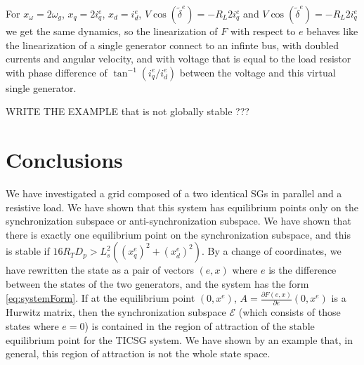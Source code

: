 \documentclass[letterpaper, 10 pt, conference]{ieeeconf}
\renewcommand{\o}    {{\omega}}
\begin{document}
For $x_\o=2\o_g$, $x_q=2 i_q^e$, $x_d=i_d^e$, $V\cos(\tilde{\delta}^e)
= -R_L 2 i_q^e$ and $V \cos(\tilde{\delta}^e) = -R_L 2 i_q^e$ we get
the same dynamics, so the linearization of $F$ with respect to $e$
behaves like the linearization of a single generator connect to an
infinte bus, with doubled currents and angular velocity, and with
voltage that is equal to the load resistor with phase difference of
$\tan^{-1}\left(i_q^e / i_d^e\right)$ between the voltage and this
virtual single generator.

WRITE THE EXAMPLE that is not globally stable ???

\section{Conclusions}

We have investigated a grid composed of a two identical SGs in
parallel and a resistive load. We have shown that this system has
equilibrium points only on the synchronization subspace or
anti-synchronization subspace. We have shown that there is exactly one
equilibrium point on the synchronization subspace, and this is stable
if $16 R_T D_p>L_s^2\left(\left(x_q^e\right)^2+\left(x_d^e\right)^2
\right)$. By a change of coordinates, we have rewritten the state as a
pair of vectors $(e,x)$ where $e$ is the difference between the states
of the two generators, and the system has the form 
\eqref{eq:systemForm}. If at the equilibrium point $(0,x^e)$,
$A=\frac{\partial F(e,x)}{\partial e}\left(0,x^e\right)$ is a Hurwitz
matrix, then the synchronization subspace $\mathscr{E}$ (which
consists of those states where $e=0$) is contained in the region of
attraction of the stable equilibrium point for the TICSG system. We
have shown by an example that, in general, this region of attraction
is not the whole state space.
\end{document}
